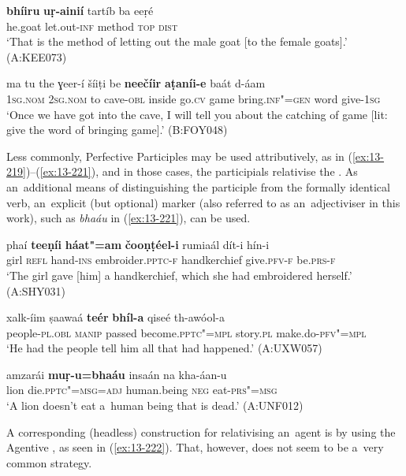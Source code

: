 \ex
\label{ex:13-217}
\gll \textbf{bhíiru} \textbf{uṛ-ainií} tartíb ba eeṛé\\
he.goat let.out-\textsc{inf} method \textsc{top} \textsc{dist} \\
\glt `That is the method of letting out the male goat [to the female goats].' (A:KEE073)

\ex
\label{ex:13-218}
\gll ma tu the ɣeer-í šíiṭi be \textbf{neečíir} \textbf{ aṭaníi-e} baát d-áam \\
\textsc{1sg.nom} \textsc{2sg.nom} to cave-\textsc{obl} inside go.\textsc{cv} game  bring.\textsc{inf"=gen} word give-\textsc{1sg} \\
\glt `Once we have got into the cave, I will tell you about the catching of game [lit: give the word of bringing game].' (B:FOY048) 
\z

Less commonly, Perfective Participles may be used attributively, as in (\ref{ex:13-219})--(\ref{ex:13-221}), and in those cases, the participials relativise the . As an~additional means of distinguishing the participle from the formally identical   verb, an~explicit (but optional)  marker (also referred to as an~adjectiviser in this work), such as \textit{bhaáu} in (\ref{ex:13-221}), can be used.

\ea
\label{ex:13-219}
\gll phaí \textbf{teeṇíi} \textbf{háat"=am} \textbf{čooṇṭéel-i} rumiaál dít-i hín-i\\
girl \textsc{refl} hand-\textsc{ins} embroider.\textsc{pptc-f} handkerchief give.\textsc{pfv-f} be.\textsc{prs-f}\\
\glt `The girl gave [him] a handkerchief, which she had embroidered herself.' (A:SHY031)

\ex
\label{ex:13-220}
\gll xalk-íim ṣaawaá \textbf{teér} \textbf{bhíl-a} qiseé th-awóol-a\\
people-\textsc{pl.obl} \textsc{manip} passed become.\textsc{pptc"=mpl} story.\textsc{pl} make.do-\textsc{pfv"=mpl}\\
\glt `He had the people tell him all that had happened.' (A:UXW057)

\ex
\label{ex:13-221}
\gll amzarái \textbf{muṛ-u=bhaáu} insaán na  kha-áan-u \\
lion die.\textsc{pptc"=msg=adj} human.being \textsc{neg} eat-\textsc{prs"=msg} \\
\glt `A lion doesn't eat a~human being that is dead.' (A:UNF012) 
\z

A corresponding (headless) construction for relativising an~agent  is by using the Agentive , as seen in (\ref{ex:13-222}). That, however, does not seem to be a~very common strategy. 

